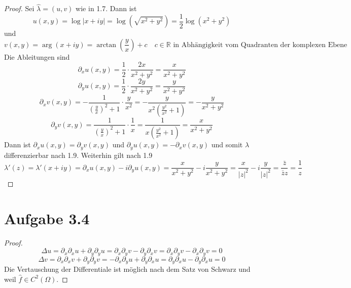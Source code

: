 \documentclass[10pt,a4paper]{article}
\begin{document}
\begin{proof}
  Sei $\hat{\lambda} = (u, v)$ wie in 1.7. Dann ist
  \begin{equation}
    u(x, y) = \log |x + iy| = \log\left( \sqrt{x^{2} + y^{2}} \right) = \frac{1}{2} \log\left( x^{2} + y^{2} \right)
  \end{equation}
  und
  \begin{equation}
    v(x, y) = \arg(x + iy) = \arctan\left( \frac{y}{x} \right) + c\quad \text{$c \in \mathbb{R}$ in Abhängigkeit vom Quadranten der komplexen Ebene}
  \end{equation}
  Die Ableitungen sind
  \begin{equation}
    \partial_{x} u(x, y) = \frac{1}{2} \cdot \frac{2x}{x^{2} + y^{2}} = \frac{x}{x^{2} + y^{2}}
  \end{equation}
  \begin{equation}
    \partial_{y} u(x, y) = \frac{1}{2} \cdot \frac{2y}{x^{2} + y^{2}} = \frac{y}{x^{2} + y^{2}}
  \end{equation}
  \begin{equation}
    \partial_{x} v(x, y) = -\frac{1}{\left( \frac{y}{x} \right)^{2} + 1} \cdot \frac{y}{x^{2}} = -\frac{y}{x^{2}(\frac{y^{2}}{x^{2}} + 1)} = -\frac{y}{x^{2} + y^{2}}
  \end{equation}
  \begin{equation}
    \partial_{y} v(x, y) = \frac{1}{\left( \frac{y}{x} \right)^{2} + 1} \cdot \frac{1}{x} = \frac{1}{x(\frac{y^{2}}{x^{2}} + 1)} = \frac{x}{x^{2} + y^{2}}
  \end{equation}
  Dann ist $\partial_{x} u(x, y) = \partial_{y} v(x, y)$ und
  $\partial_{y} u(x, y) = -\partial_{x} v(x, y)$ und somit $\lambda$
  differenzierbar nach 1.9. Weiterhin gilt nach 1.9
  \begin{equation}
    \lambda'(z) = \lambda'(x + iy) = \partial_{x} u(x, y) - i\partial_{y} u(x, y) = \frac{x}{x^{2} + y^{2}} - i\frac{y}{x^{2} + y^{2}} = \frac{x}{|z|^{2}} - i \frac{y}{|z|^{2}} = \frac{\bar{z}}{\bar{z}z} = \frac{1}{z}
  \end{equation}
\end{proof}

\section{Aufgabe 3.4}

\begin{proof}
  \begin{equation}
    \Delta u = \partial_{x} \partial_{x} u + \partial_{y} \partial_{y} u = \partial_{x} \partial_{y} v - \partial_{y} \partial_{x} v = \partial_{x} \partial_{y} v - \partial_{x} \partial_{y} v = 0
  \end{equation}
  \begin{equation}
    \Delta v = \partial_{x} \partial_{x} v + \partial_{y} \partial_{y} v = -\partial_{x} \partial_{y} u + \partial_{y} \partial_{x} u = \partial_{y} \partial_{x} u - \partial_{y} \partial_{x} u = 0
  \end{equation}
  Die Vertauschung der Differentiale ist möglich nach dem Satz von Schwarz und
  weil $\hat{f} \in C^{2}(\Omega)$.
\end{proof}
\end{document}

